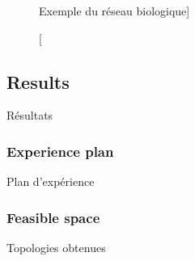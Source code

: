 \begin{figure}
\hspace{0.2cm}
\caption[Biological Network Example][Exemple du réseau biologique]{}{\label{fig:networkgrowth:bioexample}}
\end{figure}


\subsection{Results}{Résultats}


\subsubsection{Experience plan}{Plan d'expérience}





\subsubsection{Feasible space}{Topologies obtenues}




